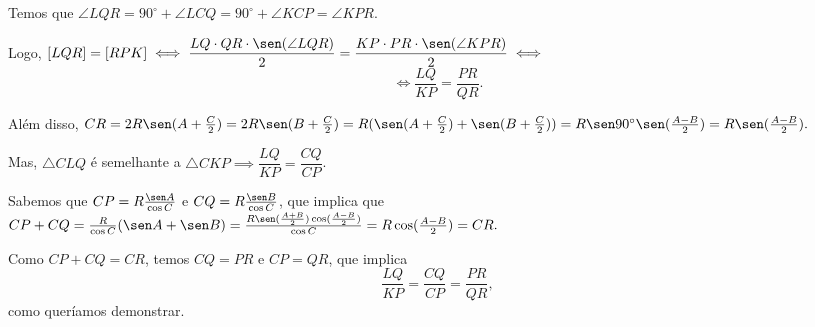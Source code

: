 Temos que $\angle LQR = 90^\circ + \angle LCQ = 90^\circ + \angle KCP = \angle KPR$.

Logo, $[LQR] = [RPK] \iff \dfrac{LQ \cdot QR \cdot \sen(\angle LQR)}{2} = \dfrac{KP \cdot PR \cdot \sen(\angle KPR)}{2} \iff$
$$\iff \frac{LQ}{KP} = \frac{PR}{QR}.$$

Além disso, $CR = 2R \sen(A + \frac{C}{2}) = 2R \sen(B + \frac{C}{2}) = R (\sen (A + \frac{C}{2}) + \sen (B + \frac{C}{2})) = R \sen 90^\circ \sen(\frac{A-B}{2}) = R \sen(\frac{A-B}{2}).$

Mas, $\triangle CLQ$ é semelhante a $\triangle CKP \implies \dfrac{LQ}{KP} = \dfrac{CQ}{CP}$.

Sabemos que $CP = R \frac{\sen A}{\cos C}$ e $CQ = R \frac{\sen B}{\cos C}$, que implica que $CP + CQ = \frac{R}{\cos C} (\sen A + \sen B) = \frac{R \sen(\frac{A+B}{2}) \cos(\frac{A-B}{2})}{\cos C} = R \cos(\frac{A-B}{2}) = CR.$

Como $CP + CQ = CR$, temos $CQ = PR$ e $CP = QR$, que implica
$$\frac{LQ}{KP} = \frac{CQ}{CP} = \frac{PR}{QR},$$
como queríamos demonstrar.
